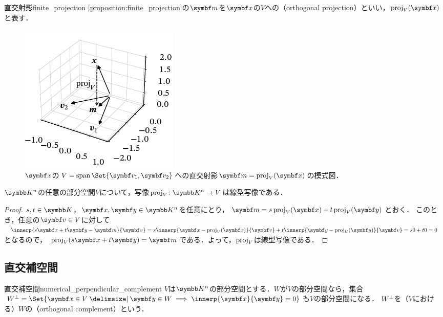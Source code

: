 \documentclass[../../main]{subfiles}
\begin{document}
\begin{definition}{直交射影}{finite_projection}
  \cref{proposition:finite_projection}の\(\vect{m}\)を\(\vect{x}\)の\(V\)への（orthogonal projection）といい，\(\proj_V(\vect{x})\)と表す．
\end{definition}

\begin{figure}[htbp]
  \centering
  \includegraphics{proj3d.pdf}
  \caption{\(\vect{x}\)の\(V=\spannedby\Set{\vect{v}_1,\vect{v}_2}\)への直交射影\(\vect{m}=\proj_V(\vect{x})\)の模式図．}
\end{figure}

\begin{proposition}{}{}
  \(\numset{K}^n\)の任意の部分空間\(V\)について，写像\(\proj_V\colon\numset{K}^n\to V\)は線型写像である．
\end{proposition}

\begin{proof}
  \(s,t\in\numset{K}\)，\(\vect{x},\vect{y}\in\numset{K}^n\)を任意にとり，\(\vect{m}=s\proj_V(\vect{x})+t\proj_V(\vect{y})\)とおく．
  このとき，任意の\(\vect{v}\in V\)に対して\(\innerp{s\vect{x}+t\vect{y}-\vect{m}}{\vect{v}}=s\innerp{\vect{x}-\proj_V(\vect{x})}{\vect{v}}+t\innerp{\vect{y}-\proj_V(\vect{y})}{\vect{v}}=s0+t0=0\)となるので，
  \(\proj_V(s\vect{x}+t\vect{y})=\vect{m}\)である．よって，\(\operatorname{proj}_V\)は線型写像である．
\end{proof}

\subsection{直交補空間}
\begin{definition}{直交補空間}{numerical_perpendicular_complement}
  \(V\)は\(\numset{K}^n\)の部分空間とする．\(W\)が\(V\)の部分空間なら，集合\(\pcomp{W}=\Set{\vect{x}\in V\given\vect{y}\in W\implies\innerp{\vect{x}}{\vect{y}}=0}\)も\(V\)の部分空間になる．
  \(W^{\mathord{\perp}}\)を（\(V\)における）\(W\)の（orthogonal complement）という．
\end{definition}
\end{document}
